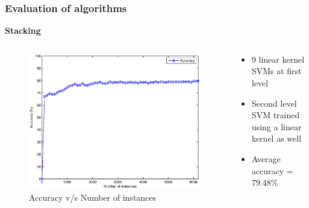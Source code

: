 \documentclass{beamer}
\begin{document}
    \begin{frame}
        \frametitle{Evaluation of algorithms}
        \begin{center}
            \textbf{Stacking}
        \end{center}
        \begin{columns}
            \begin{column}{0.5\textwidth}
                \begin{figure}
                    \centering
                    \includegraphics[width=\textwidth]{figures/stacking_accuracy.eps}
                    \caption{Accuracy v/s Number of instances}
                \end{figure}
            \end{column}
            \begin{column}{0.5\textwidth}
                \begin{itemize}
                    \item{9 linear kernel SVMs at first level}
                    \item{Second level SVM trained using a linear kernel as well}
                    \item{Average accuracy = 79.48\%}
                \end{itemize}
            \end{column}
        \end{columns}
    \end{frame}
    
\end{document}
